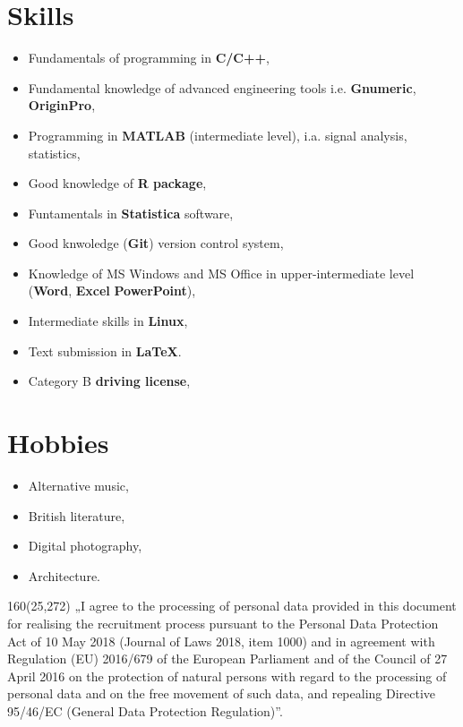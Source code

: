 \documentclass[10pt, a4paper, sans]{moderncv}   %
\begin{document}
\section{Skills}
{\begin{itemize}
	\item Fundamentals of programming in \textbf{C/C++}, 
	\item Fundamental knowledge of advanced engineering tools i.e. \textbf{Gnumeric}, \textbf{OriginPro},
	\item Programming in \textbf{MATLAB} (intermediate level), i.a. signal analysis, statistics,
    \item Good knowledge of \textbf{R package},
    \item Funtamentals in \textbf{Statistica} software,
    \item Good knwoledge (\textbf{Git}) version control system,
	\item Knowledge of MS Windows and MS Office in upper-intermediate level (\textbf{Word}, \textbf{Excel} \textbf{PowerPoint}),
	\item Intermediate skills in \textbf{Linux},
	\item Text submission in \textbf{\LaTeX}.
	\item Category B \textbf{driving license},
\end{itemize}}



\section{Hobbies}
{\begin{itemize}
\item Alternative music,
\item British literature,
\item Digital photography,
\item Architecture.

\end{itemize}}

\begin{textblock}{160}(25,272)
\noindent „I agree to the processing of personal data provided in this document for realising the recruitment process pursuant to the Personal Data Protection Act of 10 May 2018 (Journal of Laws 2018, item 1000) and in agreement with Regulation (EU) 2016/679 of the European Parliament and of the Council of 27 April 2016 on the protection of natural persons with regard to the processing of personal data and on the free movement of such data, and repealing Directive 95/46/EC (General Data Protection Regulation)”.

\end{textblock}
\end{document}
